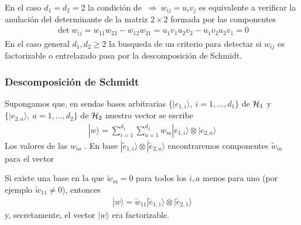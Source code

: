 \documentclass[letterpaper,10pt,english]{jupyterBook}
\newcommand{\ket}[1]{|#1\rangle}
\newcommand{\Hil}{{\cal H}}
\begin{document}
\sphinxAtStartPar
En el caso  \(d_1 = d_2 =2\)  la condición de  \(~\Rightarrow ~w_{ij} = u_i v_j\) es equivalente a verificar
la anulación del  determinante de la matriz \(2\times 2\) formada por las componentes
\begin{equation*}
\begin{split}\det w_{ij} =  w_{11}w_{22}- w_{12}w_{21} = u_1v_1u_2v_2-u_1v_2u_2v_1=0\end{split}
\end{equation*}
\sphinxAtStartPar
En el caso general \(d_1, d_2 \geq 2\) la busqueda de un criterio para detectar si \(w_{ij}\) es factorizable o entrelazado pasa por la descomposición de Schmidt.

\sphinxAtStartPar



\subsubsection{Descomposición de Schmidt}
\label{\detokenize{docs/Part_01_Formalismo/Chapter_01_02_Formalismo_matem_xe1tico/01_04_Tensores_myst:descomposicion-de-schmidt}}
\sphinxAtStartPar
Supongamos que, en sendas bases arbitrarias \(\{\ket{e_{1,i}},~ i=1,...,d_1\}\)  de \(\Hil_1\) y  \(\{\ket{e_{2,a}},~a=1,...,d_2\}\)  de \(\Hil_2\) nuestro vector se escribe
\begin{equation*}
\begin{split}
\ket{w} = \sum_{i=1}^{d_1}\sum_{a=1}^{d_2} w_{ia} \ket{e_{1,i}}\otimes \ket{e_{2,a}}
\end{split}
\end{equation*}
\sphinxAtStartPar
Los valores de las  \(w_{ia}\) . En  base \(\ket{ \tilde e_{1,i}}\otimes\ket{\tilde e_{2,a}}\) encontraremos  componentes \(\tilde w_{ia}\) para el  vector

\sphinxAtStartPar
Si existe una base en la que \(\tilde w_{ia}=0\) para todos los \(i,a\) menos para uno (por ejemplo \(\tilde w_{11}\neq 0\)), entonces
\begin{equation*}
\begin{split}\ket{w}= \tilde w_{11}\ket{\tilde e_{1,1}}\otimes \ket{\tilde e_{2,1}}\end{split}
\end{equation*}
\sphinxAtStartPar
y, secretamente, el vector \(\ket{w}\) era factorizable.
\end{document}
